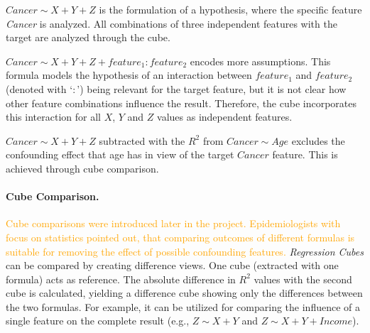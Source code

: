 \documentclass[journal]{style/vgtc} 			          %
\newcommand{\design}[1]{\textcolor{orange}{#1}}
\begin{document}
$Cancer \sim X + Y + Z$ is the formulation of a hypothesis, where the specific feature \textit{Cancer} is analyzed.
All combinations of three independent features with the target are analyzed through the cube.

$Cancer \sim X + Y + Z + feature_1:feature_2$ encodes more assumptions.
This formula models the hypothesis of an interaction between $feature_1$ and $feature_2$ (denoted with `$:$') being relevant for the target feature, but it is not clear how other feature combinations influence the result.
Therefore, the cube incorporates this interaction for all $X$, $Y$ and $Z$ values as independent features.

$Cancer \sim X + Y + Z$ subtracted with the $R^2$ from $Cancer \sim Age$ excludes the confounding effect that age has in view of the target $Cancer$ feature.
This is achieved through cube comparison.

\paragraph{Cube Comparison.}
\design{
Cube comparisons were introduced later in the project.
Epidemiologists with focus on statistics pointed out, that comparing outcomes of different formulas is suitable for removing the effect of possible confounding features.
}
\emph{Regression Cubes} can be compared by creating difference views.
One cube (extracted with one formula) acts as reference.
The absolute difference in $R^2$ values with the second cube is calculated, yielding a difference cube showing only the differences between the two formulas.
For example, it can be utilized for comparing the influence of a single feature on the complete result (e.g., $Z \sim X + Y$ and $Z \sim X + Y + Income$).
\end{document}
